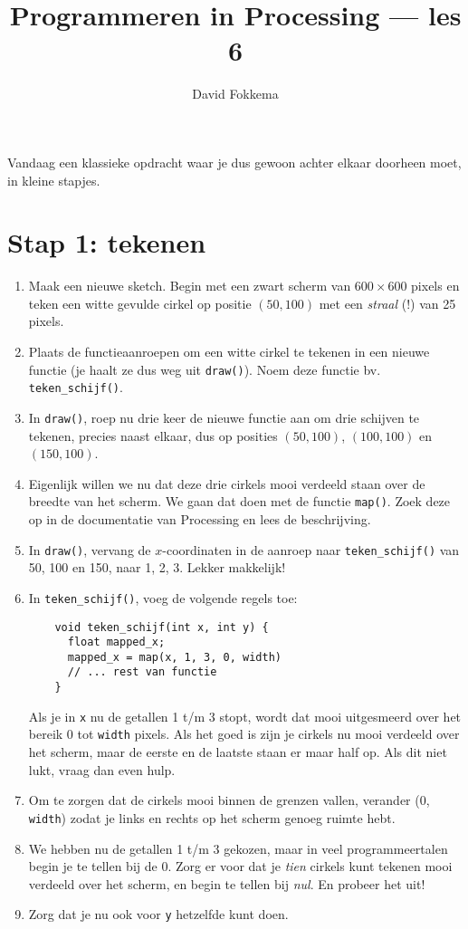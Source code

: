 \documentclass[a4paper,11pt]{article}
\title{Programmeren in Processing --- les 6}
\author{David Fokkema}
\begin{document}
\maketitle

Vandaag een klassieke opdracht waar je dus gewoon achter elkaar doorheen moet, in kleine stapjes.


\section{Stap 1: tekenen}

\begin{enumerate}
\item Maak een nieuwe sketch.  Begin met een zwart scherm van $600\times 600$ pixels en teken een witte gevulde cirkel op positie $(50, 100)$ met een \emph{straal} (!) van 25 pixels.
\item Plaats de functieaanroepen om een witte cirkel te tekenen in een nieuwe functie (je haalt ze dus weg uit \verb|draw()|).  Noem deze functie bv. \verb|teken_schijf()|.
\item In \verb|draw()|, roep nu drie keer de nieuwe functie aan om drie schijven te tekenen, precies naast elkaar, dus op posities $(50, 100)$, $(100, 100)$ en $(150, 100)$.
\item Eigenlijk willen we nu dat deze drie cirkels mooi verdeeld staan over de breedte van het scherm. We gaan dat doen met de functie \verb|map()|.  Zoek deze op in de documentatie van Processing en lees de beschrijving.
\item In \verb|draw()|, vervang de $x$-coordinaten in de aanroep naar \verb|teken_schijf()| van 50, 100 en 150, naar 1, 2, 3. Lekker makkelijk!
\item In \verb|teken_schijf()|, voeg de volgende regels toe:
  \begin{verbatim}
    void teken_schijf(int x, int y) {
      float mapped_x;
      mapped_x = map(x, 1, 3, 0, width)
      // ... rest van functie
    }
  \end{verbatim}
  Als je in \verb|x| nu de getallen 1 t/m 3 stopt, wordt dat mooi uitgesmeerd over het bereik 0 tot \verb|width| pixels.  Als het goed is zijn je cirkels nu mooi verdeeld over het scherm, maar de eerste en de laatste staan er maar half op.  Als dit niet lukt, vraag dan even hulp.
\item Om te zorgen dat de cirkels mooi binnen de grenzen vallen, verander (0, \verb|width|) zodat je links en rechts op het scherm genoeg ruimte hebt.
\item We hebben nu de getallen 1 t/m 3 gekozen, maar in veel programmeertalen begin je te tellen bij de 0.  Zorg er voor dat je \emph{tien} cirkels kunt tekenen mooi verdeeld over het scherm, en begin te tellen bij \emph{nul}.  En probeer het uit!
\item Zorg dat je nu ook voor \verb|y| hetzelfde kunt doen.
\end{enumerate}
\end{document}
